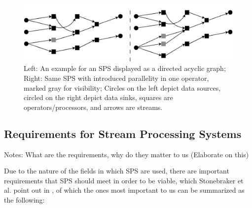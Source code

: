         \begin{figure}[h]
            \label{fig:sps_parallel_normal}
            \centering
            \includegraphics[width=1.0\textwidth]{Bilder/sps_parallel_normal.png}
            \caption{
                    Left: An example for an SPS displayed as a directed acyclic graph;
                    Right: Same SPS with introduced parallelity in one operator, marked gray for visibility;
                    Circles on the left depict data sources, circled on the right depict data sinks, squares are operators/processors, and arrows are streams.
                    }
        \end{figure}


        \subsection{Requirements for Stream Processing Systems}
        \label{sub:requirements}

        Notes: What are the requirements, why do they matter to us (Elaborate on this)

        Due to the nature of the fields in which SPS are used, there are important requirements that SPS should meet in order to be viable, 
        which Stonebraker et al. point out in \cite{Stonebraker:2005:RRS:1107499.1107504}, of which the ones most important to us can be summarized as the following:
        
